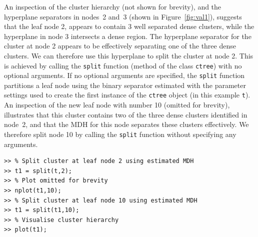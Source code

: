 \documentclass{book}
\begin{document}
\noindent
%
An inspection of the cluster hierarchy (not shown for brevity), and the
hyperplane separators in nodes~2 and~3 (shown in Figure~\ref{fig:val1}), suggests that
the leaf node 2, appears to contain 3 well separated dense clusters, while the
hyperplane in node 3 intersects a dense region.
%
The hyperplane separator for the cluster at node 2 appears to be effectively
separating one of the three dense clusters. We can therefore use this
hyperplane to split the cluster at node 2. 
%
This is achieved by calling the {\tt split} function (method of the class {\tt ctree})
with no optional arguments. 
%
If no optional arguments are specified, the {\tt split} function partitions
a leaf node using the binary separator estimated with the parameter settings used
to create the first instance of the {\tt ctree} object (in this example {\tt t}).
%
%
An inspection of the new leaf node with number 10 (omitted for brevity),
illustrates that this cluster contains two of the three dense clusters
identified in node~2, and that the MDH for this node separates these clusters
effectively.
%
We therefore split node 10 by calling the {\tt  split} function without
specifying any arguments.


\begin{verbatim}
>> % Split cluster at leaf node 2 using estimated MDH
>> t1 = split(t,2);
>> % Plot omitted for brevity
>> nplot(t1,10);
>> % Split cluster at leaf node 10 using estimated MDH
>> t1 = split(t1,10);
>> % Visualise cluster hierarchy
>> plot(t1);
\end{verbatim}
\end{document}
